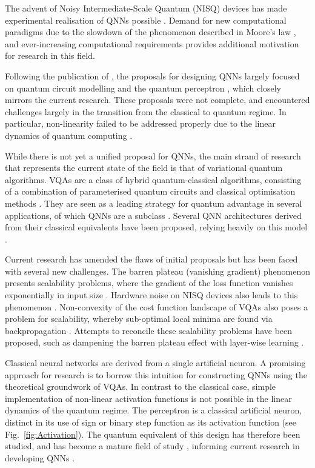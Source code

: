 \documentclass[twocolumn,superscriptaddress]{revtex4-1}
\begin{document}
The advent of Noisy Intermediate-Scale Quantum (NISQ) devices has made experimental realisation of QNNs possible \cite{Beer:2022wgv}. Demand for new computational paradigms due to the slowdown of the phenomenon described in Moore's law \cite{8123662, Shalf2020}, and ever-increasing computational requirements \cite{PERALGARCIA2024100619} provides additional motivation for research in this field.

Following the publication of \cite{KAK1995143}, the proposals for designing QNNs largely focused on quantum circuit modelling and the quantum perceptron \cite{Schuld_2014, 9137960}, which closely mirrors the current research. These proposals were not complete, and encountered challenges largely in the transition from the classical to quantum regime. In particular, non-linearity failed to be addressed properly due to the linear dynamics of quantum computing \cite{Schuld_2014}.

While there is not yet a unified proposal for QNNs, the main strand of research that represents the current state of the field is that of variational quantum algorithms. VQAs are a class of hybrid quantum-classical algorithms, consisting of a combination of parameterised quantum circuits and classical optimisation methods \cite{mangini2023variational}. They are seen as a leading strategy for quantum advantage in several applications, of which QNNs are a subclass \cite{Cerezo_2021}. Several QNN architectures derived from their classical equivalents have been proposed, relying heavily on this model \cite{PERALGARCIA2024100619}.

Current research has amended the flaws of initial proposals but has been faced with several new challenges. The barren plateau (vanishing gradient) phenomenon presents scalability problems, where the gradient of the loss function vanishes exponentially in input size \cite{zhao2021review, Clean_2018}. Hardware noise on NISQ devices also leads to this phenomenon \cite{Wang_2021, Cerezo_2021}. Non-convexity of the cost function landscape of VQAs also poses a problem for scalability, whereby sub-optimal local minima are found via backpropagation \cite{riveradean2021avoiding}. Attempts to reconcile these scalability problems have been proposed, such as dampening the barren plateau effect with layer-wise learning \cite{Skolik_2021}.

Classical neural networks are derived from a single artificial neuron. A promising approach for research is to borrow this intuition for constructing QNNs using the theoretical groundwork of VQAs. In contrast to the classical case, simple implementation of non-linear activation functions is not possible in the linear dynamics of the quantum regime. The perceptron is a classical artificial neuron, distinct in its use of sign or binary step function as its activation function (see Fig.~\ref{fig:Activation}). The quantum equivalent of this design has therefore been studied, and has become a mature field of study \cite{Tacchino_2019}, informing current research in developing QNNs \cite{Tacchino_2020}.
\end{document}
